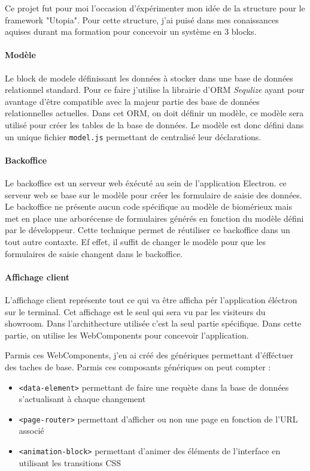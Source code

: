 \documentclass{article}
\begin{document}
Ce projet fut pour moi l'occasion d'éxpérimenter mon idée de la structure pour le framework "Utopia".
Pour cette structure, j'ai puisé dans mes conaissances aquises durant ma formation pour concevoir un système en 3 blocks.

\paragraph{Modèle} Le block de modele définissant les données à stocker dans une base de données relationnel standard.
Pour ce faire j'utilise la librairie d'ORM \emph{Sequlize} ayant pour avantage d'être compatible avec la majeur partie des base de données relationnelles actuelles.
Dans cet ORM, on doit définir un modèle, ce modèle sera utilisé pour créer les tables de la base de données.
Le modèle est donc défini dans un unique fichier \texttt{model.js} permettant de centralisé leur déclarations.

\paragraph{Backoffice} Le backoffice est un serveur web éxécuté au sein de l'application Electron.
ce serveur web se base sur le modèle pour créer les formulaire de saisie des données.
Le backoffice ne présente aucun code spécifique au modèle de biomérieux mais met en place une arborécense de formulaires générés en fonction du modèle défini par le développeur.
Cette technique permet de réutiliser ce backoffice dans un tout autre contaxte.
Ef effet, il suffit de changer le modèle pour que les formulaires de saisie changent dans le backoffice.

\paragraph{Affichage client} L'affichage client représente tout ce qui va être afficha pér l'application éléctron sur le terminal.
Cet affichage est le seul qui sera vu par les visiteurs du showroom.
Dans l'archithecture utilisée c'est la seul partie spécifique.
Dans cette partie, on utilise les WebComponents pour concevoir l'application.

Parmis ces WebComponents, j'en ai créé des génériques permettant d'éfféctuer des taches de base.
Parmis ces composants génériques on peut compter :
\begin{itemize}
    \item \texttt{<data-element>} permettant de faire une requète dans la base de données s'actualisant à chaque changement
    \item \texttt{<page-router>} permettant d'afficher ou non une page en fonction de l'URL associé
    \item \texttt{<animation-block>} permettant d'animer des éléments de l'interface en utilisant les transitions CSS
\end{itemize}
\end{document}
